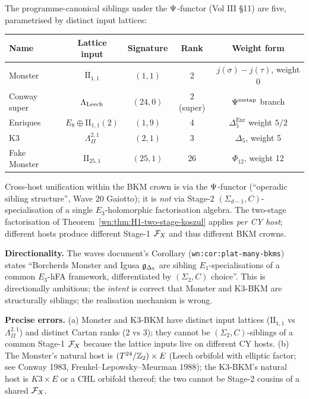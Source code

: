 \begin{conjecture}\ClaimStatusScoped
\label{wn:conj:H6-Psi-functor}
The programme-canonical siblings under the $\Psi$-functor (Vol III
\S11) are five, parametrised by distinct input lattices:
\begin{center}
\begin{tabular}{lcccc}
Name & Lattice input & Signature & Rank & Weight form \\
\hline
Monster & $\mathrm{II}_{1, 1}$ & $(1, 1)$ & 2 & $j(\sigma) - j(\tau)$, weight 0 \\
Conway super & $\Lambda_{\mathrm{Leech}}$ & $(24, 0)$ & 2 (super) & $\Psi^{\mathrm{metap}}$ branch \\
Enriques & $E_8 \oplus \mathrm{II}_{1,1}(2)$ & $(1, 9)$ & 4 & $\Delta_5^{\mathrm{Enr}}$ weight $5/2$ \\
K3 & $\Lambda^{2, 1}_{II}$ & $(2, 1)$ & 3 & $\Delta_5$, weight 5 \\
Fake Monster & $\mathrm{II}_{25, 1}$ & $(25, 1)$ & 26 & $\Phi_{12}$, weight 12 \\
\end{tabular}
\end{center}
Cross-host unification within the BKM crown is via the $\Psi$-functor
(``operadic sibling structure'', Wave 20 Gaiotto); it is \emph{not} via
Stage-2 $(\Sigma_{d-1}, C)$-specialisation of a single $E_3$-holomorphic
factorisation algebra. The two-stage factorisation of
Theorem~\ref{wn:thm:H1-two-stage-koszul} applies \emph{per CY host};
different hosts produce different Stage-1 $\mathcal{F}_X$ and thus different
BKM crowns.
\end{conjecture}

\textbf{Directionality.} The waves document's Corollary
(\verb|wn:cor:plat-many-bkms|) states ``Borcherds Monster and Igusa
$\mathfrak{g}_{\Delta_5}$ are sibling $E_1$-specialisations of a common
$E_3$-hFA framework, differentiated by $(\Sigma_2, C)$ choice''. This
is directionally ambitious; the \emph{intent} is correct that
Monster and K3-BKM are structurally siblings; the realisation
mechanism is wrong.

\textbf{Precise errors.} (a) Monster and K3-BKM have distinct input
lattices ($\mathrm{II}_{1, 1}$ vs $\Lambda^{2, 1}_{II}$) and distinct
Cartan ranks (2 vs 3); they cannot be $(\Sigma_2, C)$-siblings of a
common Stage-1 $\mathcal{F}_X$ because the lattice inputs live on different
CY hosts. (b) The Monster's natural host is $(T^{24}/\mathbb{Z}_2) \times E$
(Leech orbifold with elliptic factor; see Conway 1983, Frenkel--Lepowsky--Meurman
1988); the K3-BKM's natural host is $K3 \times E$ or a CHL orbifold
thereof; the two cannot be Stage-2 cousins of a shared $\mathcal{F}_X$.

